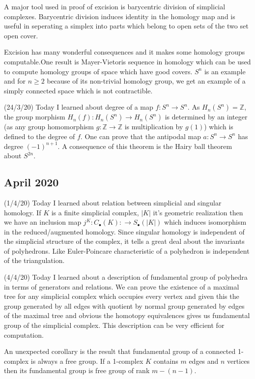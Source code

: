 \documentclass[12pt,a4paper]{article}
\begin{document}
A major tool used in proof of excision is barycentric division of simplicial complexes. Barycentric division induces identity in the homology map and is useful in seperating a simplex into parts which belong to open sets of the two set open cover.

Excision has many wonderful consequences and it makes some homology groups computable.One result is Mayer-Vietoris sequence in homology which can be used to compute homology groups of space which have good covers. $S^n$ is an example and for $n\ge 2$ because of its non-trivial homology group, we get an example of a simply connected space which is not contractible.

(24/3/20) Today I learned about degree of a map $f : S^n \to S^n$. As $H_n(S^n) = \mathbb{Z}$, the group morphism $H_n(f) : H_n(S^n) \to H_n(S^n)$ is determined by an integer (as any group homomorphism $g: \mathbb{Z} \to \mathbb{Z}$ is multiplication by $g(1)$) which is defined to the degree of $f$. One can prove that the antipodal map $a: S^n \to S^n$ has degree $(-1)^{n+1}$. A consequence of this theorem is the Hairy ball theorem about $S^{2n}$.
	
\subsection*{April 2020}

\quad (1/4/20) Today I learned about relation between simplicial and singular homology. If $K$ is a finite simplicial complex, $|K|$ it's geometric realization then we have an inclusion map $j^K : C_\bullet(K) : \to S_\bullet(|K|) $ which induces isomorphism in the reduced/augmented homology. Since singular homology is independent of the simplicial structure of the complex, it tells a great deal about the invariants of polyhedrons. Like Euler-Poincare characteristic of a polyhedron is independent of the triangulation.

(4/4/20) Today I learned about a description of fundamental group of polyhedra in terms of generators and relations. We can prove the existence of a maximal tree for any simplicial complex which occupies every vertex and given this the group generated by all edges with quotient by normal group generated by edges of the maximal tree and obvious the homotopy equivalences gives us fundamental group of the simplicial complex. This description can be very efficient for computation.

An unexpected corollary is the result that fundamental group of a connected 1-complex is always a free group. If a 1-complex $K$ contains $m$ edges and $n$ vertices then its fundamental group is free group of rank $m-(n-1)$.
\end{document}
